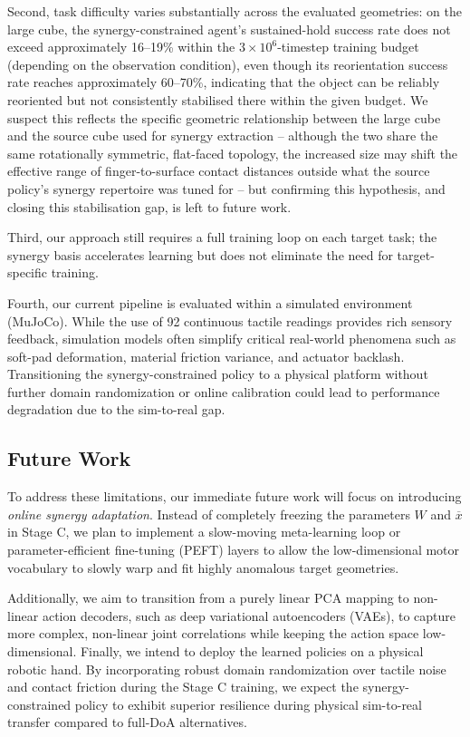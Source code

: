 \documentclass[letterpaper, 10 pt, conference]{ieeeconf}  %
\begin{document}
Second, task difficulty varies substantially across the evaluated geometries: on the large cube, the synergy-constrained agent's sustained-hold success rate does not exceed approximately 16--19\% within the $3\times10^6$-timestep training budget (depending on the observation condition), even though its reorientation success rate reaches approximately 60--70\%, indicating that the object can be reliably reoriented but not consistently stabilised there within the given budget. We suspect this reflects the specific geometric relationship between the large cube and the source cube used for synergy extraction -- although the two share the same rotationally symmetric, flat-faced topology, the increased size may shift the effective range of finger-to-surface contact distances outside what the source policy's synergy repertoire was tuned for -- but confirming this hypothesis, and closing this stabilisation gap, is left to future work.

Third, our approach still requires a full training loop on each target task; the synergy basis accelerates learning but does not eliminate the need for target-specific training.

Fourth, our current pipeline is evaluated within a simulated environment (MuJoCo). While the use of 92 continuous tactile readings provides rich sensory feedback, simulation models often simplify critical real-world phenomena such as soft-pad deformation, material friction variance, and actuator backlash. Transitioning the synergy-constrained policy to a physical platform without further domain randomization or online calibration could lead to performance degradation due to the sim-to-real gap.

\subsection{Future Work}
To address these limitations, our immediate future work will focus on introducing \textit{online synergy adaptation}. Instead of completely freezing the parameters $W$ and $\overline{x}$ in Stage C, we plan to implement a slow-moving meta-learning loop or parameter-efficient fine-tuning (PEFT) layers to allow the low-dimensional motor vocabulary to slowly warp and fit highly anomalous target geometries. 

Additionally, we aim to transition from a purely linear PCA mapping to non-linear action decoders, such as deep variational autoencoders (VAEs), to capture more complex, non-linear joint correlations while keeping the action space low-dimensional. Finally, we intend to deploy the learned policies on a physical robotic hand. By incorporating robust domain randomization over tactile noise and contact friction during the Stage C training, we expect the synergy-constrained policy to exhibit superior resilience during physical sim-to-real transfer compared to full-DoA alternatives. 
\end{document}
